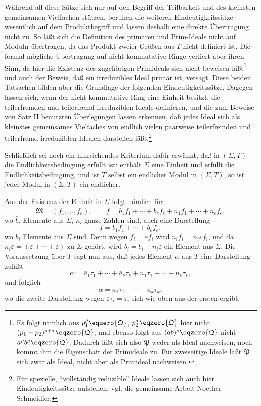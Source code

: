 \documentclass[11pt]{article}
\newcommand{\ideal}[1]{\mathfrak{#1}}
\begin{document}
Während all diese Sätze sich nur auf den Begriff der Teilbarkeit und des kleinsten gemeinsamen Vielfachen stützen, beruhen die weiteren Eindeutigkeitssätze wesentlich auf dem Produktbegriff und lassen deshalb eine direkte Übertragung nicht zu. So läßt sich die Definition des primären und Prim-Ideals nicht auf Moduln übertragen, da das Produkt zweier Größen aus $T$ nicht definiert ist. Die formal mögliche Übertragung auf nicht-kommutative Ringe verliert aber ihren Sinn, da hier die Existenz des zugehörigen Primideals sich nicht beweisen läßt\footnote{Es folgt nämlich aus $p_1^\rho\eqzero{\ideal Q}$, $p_2^\sigma\eqzero{\ideal Q}$ hier nicht $(p_1-p_2)^{\rho+\sigma}\eqzero{\ideal Q}$, und ebenso folgt aus $(ab)^\rho\eqzero{\ideal Q}$ nicht $a^\rho b^\rho\eqzero{\ideal Q}$. Dadurch läßt sich also $\ideal P$ weder als Ideal nachweisen, noch kommt ihm die Eigenschaft der Primideale zu. Für zweiseitige Ideale läßt $\ideal P$ sich zwar als Ideal, nicht aber als Primideal nachweisen.} und auch der Beweis, daß ein irreduzibles Ideal primär ist, versagt. Diese beiden Tatsachen bilden aber die Grundlage der folgenden Eindeutigkeitssätze. Dagegen lassen sich, wenn der nicht-kommutative Ring eine Einheit besitzt, die teilerfremden und teilerfremd-irreduziblen Ideale definieren, und die zum Beweise von Satz II benutzten Überlegungen lassen erkennen, daß jedes Ideal sich als kleinstes gemeinsames Vielfaches von endlich vielen paarweise teilerfremden und teilerfremd-irreduziblen Idealen darstellen läßt.\footnote{Für spezielle, ``vollständig reduzible'' Ideale lassen sich auch hier Eindeutigkeitssätze aufstellen; vgl. die gemeinsame Arbeit Noether--Schmeidler.}

Schließlich sei noch ein hinreichendes Kriterium dafür erwähnt, daß in $(\Sigma,T)$ die Endlichkeitsbedingung erfüllt ist: enthält $\Sigma$ eine Einheit und erfüllt die Endlichkeitsbedingung, und ist $T$ selbst ein endlicher Modul in $(\Sigma,T)$, so ist jeder Modul in $(\Sigma,T)$ ein endlicher.

Aus der Existenz der Einheit in $\Sigma$ folgt nämlich für
\[
 \ideal M=(f_1,
\ldots,f_e),\qquad
 f=\bar b_1f_1+\cdots+\bar b_ef_e+n_1f_1+\cdots+n_ef_e,
\]
wo $\bar b_i$ Elemente aus $\Sigma$, $n_i$ ganze Zahlen sind, auch eine Darstellung
\[
 f=b_1f_1+\cdots+b_ef_e,
\]
wo $b_i$ Elemente aus $\Sigma$ sind. Denn wegen $f_i=\varepsilon f_i$ wird $n_if_i=n_i\varepsilon f_i$, und da $n_i\varepsilon=(\varepsilon+\cdots+\varepsilon)$ zu $\Sigma$ gehört, wird $b_i=\bar b_i+n_i\varepsilon$ ein Element aus $\Sigma$. Die Voraussetzung über $T$ sagt nun aus, daß jedes Element $\alpha$ aus $T$ eine Darstellung zuläßt
\[
 \alpha=\bar a_1\tau_1+\cdots+\bar a_k\tau_k+n_1\tau_1+\cdots+n_k\tau_k,
\]
und folglich
\[
 \alpha=a_1\tau_1+\cdots+a_k\tau_k,
\]
wo die zweite Darstellung wegen $\varepsilon\tau_i=\tau_i$ sich wie oben aus der ersten ergibt.
\end{document}
